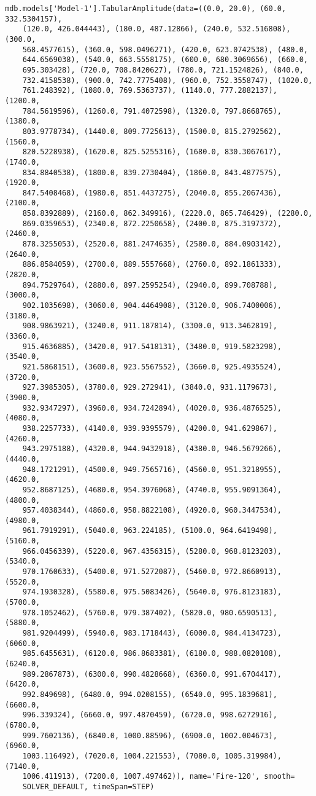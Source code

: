 \documentclass[12pt, letterpaper, oneside]{report}
\begin{document}
\begin{lstlisting}[frame=none]
mdb.models['Model-1'].TabularAmplitude(data=((0.0, 20.0), (60.0, 332.5304157), 
    (120.0, 426.044443), (180.0, 487.12866), (240.0, 532.516808), (300.0, 
    568.4577615), (360.0, 598.0496271), (420.0, 623.0742538), (480.0, 
    644.6569038), (540.0, 663.5558175), (600.0, 680.3069656), (660.0, 
    695.303428), (720.0, 708.8420627), (780.0, 721.1524826), (840.0, 
    732.4158538), (900.0, 742.7775408), (960.0, 752.3558747), (1020.0, 
    761.248392), (1080.0, 769.5363737), (1140.0, 777.2882137), (1200.0, 
    784.5619596), (1260.0, 791.4072598), (1320.0, 797.8668765), (1380.0, 
    803.9778734), (1440.0, 809.7725613), (1500.0, 815.2792562), (1560.0, 
    820.5228938), (1620.0, 825.5255316), (1680.0, 830.3067617), (1740.0, 
    834.8840538), (1800.0, 839.2730404), (1860.0, 843.4877575), (1920.0, 
    847.5408468), (1980.0, 851.4437275), (2040.0, 855.2067436), (2100.0, 
    858.8392889), (2160.0, 862.349916), (2220.0, 865.746429), (2280.0, 
    869.0359653), (2340.0, 872.2250658), (2400.0, 875.3197372), (2460.0, 
    878.3255053), (2520.0, 881.2474635), (2580.0, 884.0903142), (2640.0, 
    886.8584059), (2700.0, 889.5557668), (2760.0, 892.1861333), (2820.0, 
    894.7529764), (2880.0, 897.2595254), (2940.0, 899.708788), (3000.0, 
    902.1035698), (3060.0, 904.4464908), (3120.0, 906.7400006), (3180.0, 
    908.9863921), (3240.0, 911.187814), (3300.0, 913.3462819), (3360.0, 
    915.4636885), (3420.0, 917.5418131), (3480.0, 919.5823298), (3540.0, 
    921.5868151), (3600.0, 923.5567552), (3660.0, 925.4935524), (3720.0, 
    927.3985305), (3780.0, 929.272941), (3840.0, 931.1179673), (3900.0, 
    932.9347297), (3960.0, 934.7242894), (4020.0, 936.4876525), (4080.0, 
    938.2257733), (4140.0, 939.9395579), (4200.0, 941.629867), (4260.0, 
    943.2975188), (4320.0, 944.9432918), (4380.0, 946.5679266), (4440.0, 
    948.1721291), (4500.0, 949.7565716), (4560.0, 951.3218955), (4620.0, 
    952.8687125), (4680.0, 954.3976068), (4740.0, 955.9091364), (4800.0, 
    957.4038344), (4860.0, 958.8822108), (4920.0, 960.3447534), (4980.0, 
    961.7919291), (5040.0, 963.224185), (5100.0, 964.6419498), (5160.0, 
    966.0456339), (5220.0, 967.4356315), (5280.0, 968.8123203), (5340.0, 
    970.1760633), (5400.0, 971.5272087), (5460.0, 972.8660913), (5520.0, 
    974.1930328), (5580.0, 975.5083426), (5640.0, 976.8123183), (5700.0, 
    978.1052462), (5760.0, 979.387402), (5820.0, 980.6590513), (5880.0, 
    981.9204499), (5940.0, 983.1718443), (6000.0, 984.4134723), (6060.0, 
    985.6455631), (6120.0, 986.8683381), (6180.0, 988.0820108), (6240.0, 
    989.2867873), (6300.0, 990.4828668), (6360.0, 991.6704417), (6420.0, 
    992.849698), (6480.0, 994.0208155), (6540.0, 995.1839681), (6600.0, 
    996.339324), (6660.0, 997.4870459), (6720.0, 998.6272916), (6780.0, 
    999.7602136), (6840.0, 1000.88596), (6900.0, 1002.004673), (6960.0, 
    1003.116492), (7020.0, 1004.221553), (7080.0, 1005.319984), (7140.0, 
    1006.411913), (7200.0, 1007.497462)), name='Fire-120', smooth=
    SOLVER_DEFAULT, timeSpan=STEP)
	

\end{lstlisting}
\end{document}
